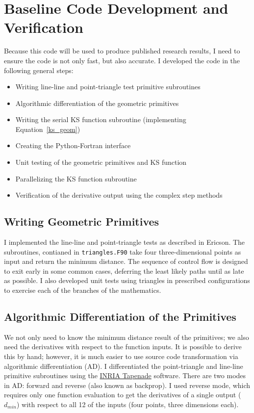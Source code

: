 \documentclass[11pt,letterpaper]{article}
\begin{document}
\section{Baseline Code Development and Verification}
\qquad Because this code will be used to produce published research results, I need to ensure the code is not only fast, but also accurate.
I developed the code in the following general steps:
\begin{itemize}
  \item Writing line-line and point-triangle test primitive subroutines
  \item Algorithmic differentiation of the geometric primitives
  \item Writing the serial KS function subroutine (implementing Equation~\ref{ks_geom})
  \item Creating the Python-Fortran interface
  \item Unit testing of the geometric primitives and KS function
  \item Parallelizing the KS function subroutine
  \item Verification of the derivative output using the complex step methods
\end{itemize}

\subsection{Writing Geometric Primitives}
\qquad I implemented the line-line and point-triangle tests as described in Ericson. %
The subroutines, contianed in \texttt{triangles.F90} take four three-dimensional points as input and return the minimum distance.
The sequence of control flow is designed to exit early in some common cases, deferring the least likely paths until as late as possible.
I also developed unit tests using triangles in prescribed configurations to exercise each of the branches of the mathematics.

\subsection{Algorithmic Differentiation of the Primitives}
\qquad We not only need to know the minimum distance result of the primitives; we also need the derivatives with respect to the function inputs.
It is possible to derive this by hand; however, it is much easier to use source code transformation via algorithmic differentiation (AD).
I differentiated the point-triangle and line-line primitive subroutines using the \href{https://www-sop.inria.fr/tropics/tapenade.html}{INRIA Tapenade} software.
There are two modes in AD: forward and reverse (also known as backprop).
I used reverse mode, which requires only one function evaluation to get the derivatives of a single output ($d_{min}$) with respect to all 12 of the inputs (four points, three dimensions each).
\end{document}
